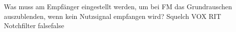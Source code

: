     {Was muss am Empfänger eingestellt werden, um bei FM das Grundrauschen auszublenden, wenn kein Nutzsignal empfangen wird?}
    {Squelch}
    {VOX}
    {RIT}
    {Notchfilter}
    {false}{false}